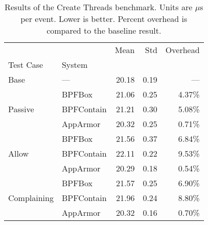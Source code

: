 \begin{table}[ht!]
\centering
\footnotesize
\caption[Results of the Create Threads benchmark]{Results of the Create Threads benchmark. Units are $\mu$s per event. Lower is better. Percent overhead is compared to the baseline result.}
\label{tab:phoronix-create-threads}
\begin{tabular}{llrrr}
\toprule
            &          &   Mean &   Std & Overhead \\
Test Case & System &        &       &          \\
\midrule
Base & --- &  20.18 &  0.19 &      --- \\
\cline{1-5}
\multirow{3}{*}{Passive} & BPFBox &  21.06 &  0.25 &   4.37\% \\
            & BPFContain &  21.21 &  0.30 &   5.08\% \\
            & AppArmor &  20.32 &  0.25 &   0.71\% \\
\cline{1-5}
\multirow{3}{*}{Allow} & BPFBox &  21.56 &  0.37 &   6.84\% \\
            & BPFContain &  22.11 &  0.22 &   9.53\% \\
            & AppArmor &  20.29 &  0.18 &   0.54\% \\
\cline{1-5}
\multirow{3}{*}{Complaining} & BPFBox &  21.57 &  0.25 &   6.90\% \\
            & BPFContain &  21.96 &  0.24 &   8.80\% \\
            & AppArmor &  20.32 &  0.16 &   0.70\% \\
\bottomrule
\end{tabular}
\end{table}
